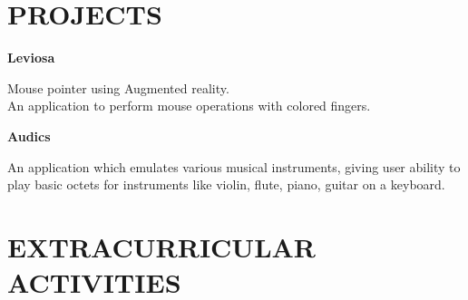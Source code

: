 \documentclass{res}
\begin{document}
\begin{resume}
\section{PROJECTS}
   \vspace{-0.1in}	
   \begin{tabbing}
    {\bf Leviosa}
   \end{tabbing}\vspace{-20pt}      %
    Mouse pointer using Augmented reality.\\An application to perform mouse operations with colored fingers.
   \begin{tabbing}
    {\bf Audics}
   \end{tabbing}\vspace{-20pt}
    An application which emulates various musical instruments, giving user ability to play basic octets for instruments like violin, flute, piano, guitar on a keyboard.
          
              
 
\section{EXTRACURRICULAR ACTIVITIES}          

 
\end{resume}
\end{document}
